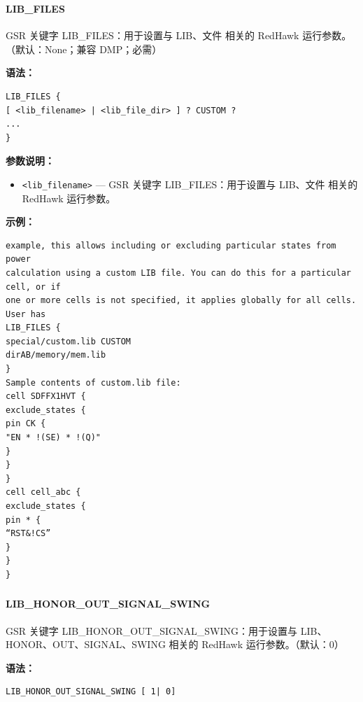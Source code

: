 \subsubsection{}
\paragraph*{LIB_FILES}

GSR 关键字 LIB_FILES：用于设置与 LIB、文件 相关的 RedHawk 运行参数。（默认：None；兼容 DMP；必需）

\textbf{语法：}
\begin{lstlisting}
LIB_FILES {
[ <lib_filename> | <lib_file_dir> ] ? CUSTOM ?
...
}
\end{lstlisting}

\textbf{参数说明：}
\begin{itemize}
\item \texttt{<lib\_filename>} — GSR 关键字 LIB\_FILES：用于设置与 LIB、文件 相关的 RedHawk 运行参数。
\end{itemize}

\textbf{示例：}
\begin{lstlisting}
example, this allows including or excluding particular states from power
calculation using a custom LIB file. You can do this for a particular cell, or if
one or more cells is not specified, it applies globally for all cells. User has
LIB_FILES {
special/custom.lib CUSTOM
dirAB/memory/mem.lib
}
Sample contents of custom.lib file:
cell SDFFX1HVT {
exclude_states {
pin CK {
"EN * !(SE) * !(Q)"
}
}
}
cell cell_abc {
exclude_states {
pin * {
“RST&!CS”
}
}
}
\end{lstlisting}

\subsubsection{}
\paragraph*{LIB_HONOR_OUT_SIGNAL_SWING}

GSR 关键字 LIB_HONOR_OUT_SIGNAL_SWING：用于设置与 LIB、HONOR、OUT、SIGNAL、SWING 相关的 RedHawk 运行参数。（默认：0）

\textbf{语法：}
\begin{lstlisting}
LIB_HONOR_OUT_SIGNAL_SWING [ 1| 0]
\end{lstlisting}

\subsubsection{}
